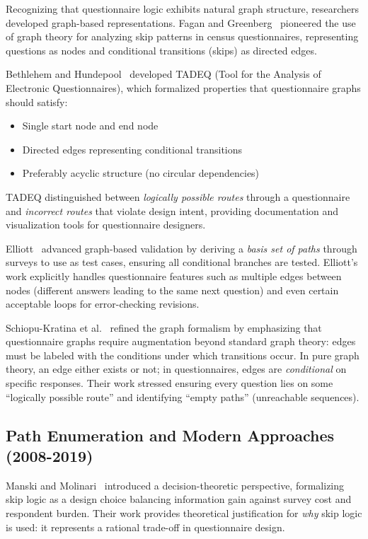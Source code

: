 Recognizing that questionnaire logic exhibits natural graph structure, researchers developed graph-based representations. Fagan and Greenberg~\cite{fagan1988census} pioneered the use of graph theory for analyzing skip patterns in census questionnaires, representing questions as nodes and conditional transitions (skips) as directed edges.

Bethlehem and Hundepool~\cite{bethlehem2004tadeq} developed TADEQ (Tool for the Analysis of Electronic Questionnaires), which formalized properties that questionnaire graphs should satisfy:

\begin{itemize}
    \item Single start node and end node
    \item Directed edges representing conditional transitions
    \item Preferably acyclic structure (no circular dependencies)
\end{itemize}

TADEQ distinguished between \emph{logically possible routes} through a questionnaire and \emph{incorrect routes} that violate design intent, providing documentation and visualization tools for questionnaire designers.

Elliott~\cite{elliott2012application} advanced graph-based validation by deriving a \emph{basis set of paths} through surveys to use as test cases, ensuring all conditional branches are tested. Elliott's work explicitly handles questionnaire features such as multiple edges between nodes (different answers leading to the same next question) and even certain acceptable loops for error-checking revisions.

Schiopu-Kratina et al.~\cite{schiopu2015survey} refined the graph formalism by emphasizing that questionnaire graphs require augmentation beyond standard graph theory: edges must be labeled with the conditions under which transitions occur. In pure graph theory, an edge either exists or not; in questionnaires, edges are \emph{conditional} on specific responses. Their work stressed ensuring every question lies on some ``logically possible route'' and identifying ``empty paths'' (unreachable sequences).

\subsection{Path Enumeration and Modern Approaches (2008-2019)}

Manski and Molinari~\cite{manski2008skip} introduced a decision-theoretic perspective, formalizing skip logic as a design choice balancing information gain against survey cost and respondent burden. Their work provides theoretical justification for \emph{why} skip logic is used: it represents a rational trade-off in questionnaire design.

